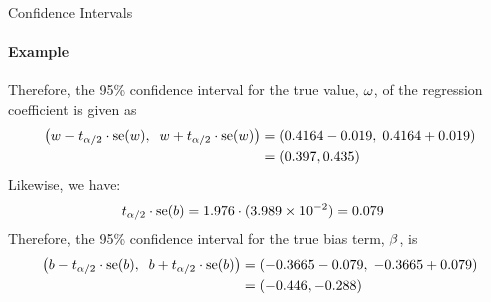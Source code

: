 \begin{frame}{Confidence Intervals}
\framesubtitle{Example}
    Therefore, the 95\% confidence interval
    for the true value, $\omega$, of the regression coefficient is given as
    \begin{align*}
        \left(w -t_{\alpha/2} \cdot \operatorname{se}(w),\;\; 
        w + t_{\alpha/2} \cdot \operatorname{se}(w) \right)&  = 
    \left( 0.4164-0.019,\; 0.4164+0.019 \right)\\
    & = (0.397, 0.435)
    \end{align*}
    Likewise, we have:
    \begin{align*}
        t_{\alpha/2} \cdot \operatorname{se}(b) & = 1.976
        \cdot (3.989 \times 10^{-2}) = 0.079
    \end{align*}
    Therefore, the 95\% confidence interval for the true bias term,
    $\beta$, is
    \begin{align*}
        \left(b -t_{\alpha/2} \cdot \operatorname{se}(b),\;\;
        b +t_{\alpha/2} \cdot \operatorname{se}(b) \right)&  = 
        \left(-0.3665-0.079,\; -0.3665+0.079 \right)\\
       &  = (-0.446, -0.288)
    \end{align*}
\end{frame}


